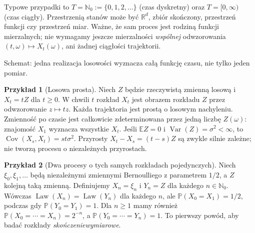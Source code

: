 \documentclass[11pt,a4paper,oneside]{report}
\numberwithin{equation}{chapter}
\theoremstyle{plain}
\theoremstyle{definition}
\newtheorem{przyklad}{Przykład}[chapter]
\theoremstyle{remark}
\newcommand{\R}{\mathbb{R}}
\newcommand{\N}{\mathbb{N}}
\newcommand{\Prob}{\mathbb{P}}
\newcommand{\E}{\mathbb{E}}
\newcommand{\Var}{\operatorname{Var}}
\newcommand{\Cov}{\operatorname{Cov}}
\newcommand{\Law}{\operatorname{Law}}
\begin{document}
Typowe przypadki to $T=\N_0:=\{0,1,2,\ldots\}$ (czas dyskretny)
oraz $T=[0,\infty)$ (czas ciągły). Przestrzenią stanów może być
$\R^d$, zbiór skończony, przestrzeń funkcji czy przestrzeń miar.
Ważne, że sam proces jest rodziną funkcji mierzalnych; nie
wymagamy jeszcze mierzalności \emph{wspólnej} odwzorowania
$(t,\omega)\mapsto X_t(\omega)$, ani żadnej ciągłości trajektorii.

\begin{center}
\par\smallskip\small Schemat: jedna realizacja losowości wyznacza całą funkcję czasu, nie tylko jeden pomiar.
\end{center}

\begin{przyklad}[Losowa prosta]
Niech $Z$ będzie rzeczywistą zmienną losową i $X_t=tZ$ dla $t\ge0$.
W chwili $t$ rozkład $X_t$ jest obrazem rozkładu $Z$ przez
odwzorowanie $z\mapsto tz$. Każda trajektoria jest prostą o losowym
nachyleniu. Zmienność po czasie jest całkowicie zdeterminowana przez
jedną liczbę $Z(\omega)$: znajomość $X_1$ wyznacza wszystkie $X_t$.
Jeśli $\E Z=0$ i $\Var(Z)=\sigma^2<\infty$, to
$\Cov(X_s,X_t)=st\sigma^2$. Przyrosty
$X_t-X_s=(t-s)Z$ są zwykle silnie zależne; nie tworzą procesu o
niezależnych przyrostach.
\end{przyklad}

\begin{przyklad}[Dwa procesy o tych samych rozkładach pojedynczych]
Niech $\xi_0,\xi_1,\ldots$ będą niezależnymi zmiennymi Bernoulliego
z parametrem $1/2$, a $Z$ kolejną taką zmienną. Definiujemy
$X_n=\xi_n$ i $Y_n=Z$ dla każdego $n\in\N_0$.
Wówczas $\Law(X_n)=\Law(Y_n)$ dla każdego $n$, ale
$\Prob(X_0=X_1)=1/2$, podczas gdy $\Prob(Y_0=Y_1)=1$.
Dla $n\ge1$ mamy również
$\Prob(X_0=\cdots=X_n)=2^{-n}$,
a $\Prob(Y_0=\cdots=Y_n)=1$.
To pierwszy powód, aby badać rozkłady \emph{skończeniewymiarowe}.
\end{przyklad}
\end{document}
